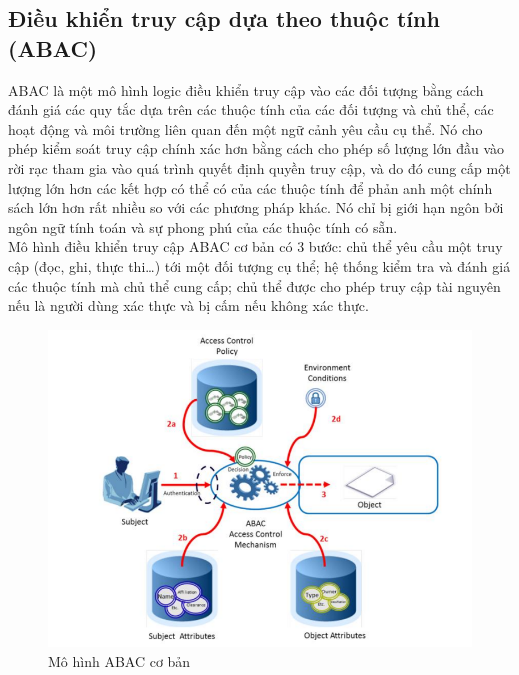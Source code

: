 \subsection{Điều khiển truy cập dựa theo thuộc tính (ABAC)}
ABAC là một mô hình logic điều khiển truy cập vào các đối tượng bằng cách
đánh giá các quy tắc dựa trên các thuộc tính của các đối tượng và chủ thể, các hoạt động
và môi trường liên quan đến một ngữ cảnh yêu cầu cụ thể. Nó cho phép kiểm soát truy
cập chính xác hơn bằng cách cho phép số lượng lớn đầu vào rời rạc tham gia vào quá
trình quyết định quyền truy cập, và do đó cung cấp một lượng lớn hơn các kết hợp có
thể có của các thuộc tính để phản anh một chính sách lớn hơn rất nhiều so với các phương
pháp khác. Nó chỉ bị giới hạn ngôn bởi ngôn ngữ tính toán và sự phong phú của các
thuộc tính có sẵn. \\

Mô hình điều khiển truy cập ABAC cơ bản có 3 bước: chủ thể yêu cầu một truy
cập (đọc, ghi, thực thi…) tới một đối tượng cụ thể; hệ thống kiểm tra và đánh giá các
thuộc tính mà chủ thể cung cấp; chủ thể được cho phép truy cập tài nguyên nếu là người
dùng xác thực và bị cấm nếu không xác thực. \\
\begin{figure}
    \centering
    \includegraphics[scale=0.5]{graphics/chapter-2/chap2-basic-abac.png}
    \caption{Mô hình ABAC cơ bản }
    \label{fig:chap2-basic-abac}
\end{figure} 

